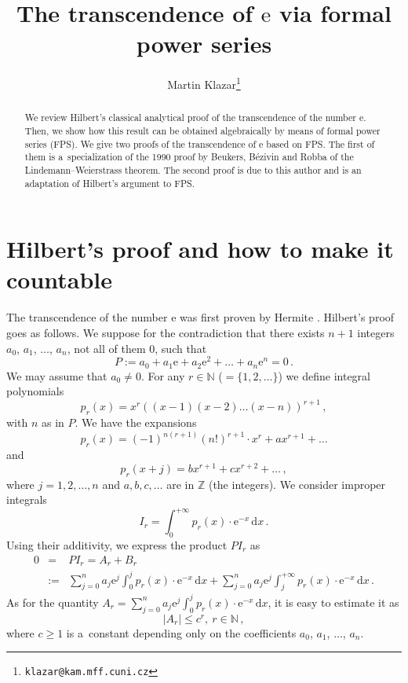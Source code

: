 \documentclass[10pt]{article}
\title{The transcendence of $\mathrm{e}$ via formal power series}
\author{Martin Klazar\footnote{{\tt klazar@kam.mff.cuni.cz}}}
\date{}
\def\N{\mathbb{N}}
\def\Z{\mathbb{Z}}
\def\ds{\dots}
\begin{document}
\maketitle

\begin{abstract}
We review Hilbert's classical analytical
proof of the transcendence of the number $\mathrm{e}$. Then, we show how this result can be obtained algebraically by means of formal power 
series (FPS). We give two proofs of the transcendence of $\mathrm{e}$ based on FPS. 
The first of them is a~specialization of the 1990 proof by 
Beukers, B\'ezivin and Robba of the Lindemann--Weierstrass theorem. The second proof is due to this author and is 
an adaptation of Hilbert's argument to FPS.    
\end{abstract}

\section{Hilbert's proof and how to make it countable}\label{sec_intro}

The transcendence of the number $\mathrm{e}$ was first proven by Hermite \cite{herm}.
Hilbert's proof \cite{hilb} goes as 
follows. We suppose for the contradiction that there exists 
$n+1$ integers $a_0$, $a_1$, $\ds$, $a_n$, not all of 
them $0$, such that  
$$
P:=
a_0+a_1\mathrm{e}+a_2\mathrm{e}^2+\ds
+a_n\mathrm{e}^n=0\,.
$$
We may assume that $a_0\ne0$. For any $r\in\N$ ($=\{1,2,\ds\}$) we define integral polynomials 
$$p_r(x)=
x^r((x-1)(x-2)\ds(x-n))^{r+1}\,, 
$$
with $n$ as in $P$. We have the expansions 
$$
p_r(x)=(-1)^{n(r+1)}(n!)^{r+1}\cdot x^r+ax^{r+1}+\ds
$$
and
$$
p_r(x+j)=bx^{r+1}+cx^{r+2}+\ds\,,
$$
where $j=1,2,\ds,n$ and $a,b,c,\ds$ are in $\Z$ (the integers). We consider improper integrals
$${\textstyle
I_r=\int_0^{+\infty}p_r(x)\cdot\mathrm{e}^{-x}\,\mathrm{d}x\,.
}
$$
Using their additivity,  we express
the product $PI_r$ as
\begin{eqnarray*}
0&=&PI_r=A_r+B_r\\
&:=&{\textstyle
\sum_{j=0}^n a_j\mathrm{e}^j\int_0^j 
p_r(x)\cdot\mathrm{e}^{-x}\,\mathrm{d}x
+\sum_{j=0}^n
a_j\mathrm{e}^j\int_j^{+\infty}
p_r(x)\cdot\mathrm{e}^{-x}\,\mathrm{d}x
}\,.
\end{eqnarray*}
As for the quantity $A_r=\sum_{j=0}^n a_j\mathrm{e}^j\int_0^j 
p_r(x)\cdot\mathrm{e}^{-x}\,\mathrm{d}x$, it is easy to 
estimate it as 
$$
|A_r|\le c^r,\ r\in\N\,,
$$
where $c\ge1$ is a~constant depending only on the coefficients $a_0$, $a_1$, $\ds$, $a_n$. 
\end{document}

